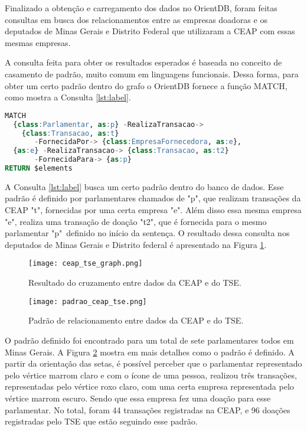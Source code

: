 Finalizado a obtenção e carregamento dos dados no OrientDB, foram feitas consultas em busca dos relacionamentos entre as empresas doadoras e os deputados de Minas Gerais e Distrito Federal que utilizaram a CEAP com essas mesmas empresas.
	
	A consulta feita para obter os resultados esperados é baseada no conceito de casamento de padrão, muito comum em linguagens funcionais. Dessa forma, para obter um certo padrão dentro do grafo o OrientDB fornece a função MATCH, como mostra a Consulta \ref{lst:label}.

\begin{lstlisting}[label={lst:label}, caption={Consulta de relacionamento de doações entre deputados e empresas.},captionpos=b, language=sql]
MATCH 
  {class:Parlamentar, as:p} -RealizaTransacao-> 
  	{class:Transacao, as:t} 
       -FornecidaPor-> {class:EmpresaFornecedora, as:e},
  {as:e} -RealizaTransacao-> {class:Transacao, as:t2} 
  	   -FornecidaPara-> {as:p}
RETURN $elements
\end{lstlisting}

A Consulta \ref{lst:label} busca um certo padrão dentro do banco de dados. Esse padrão é definido por parlamentares chamados de "p", que realizam transações da CEAP "t", fornecidas por uma certa empresa "e". Além disso essa mesma empresa "e", realiza uma transação de doação "t2", que é fornecida para o mesmo parlamentar "p"\ definido no início da sentença. O resultado dessa consulta nos deputados de Minas Gerais e Distrito federal é apresentado na Figura \ref{fig:ceap_tse_graph}.

\begin{figure}[H]
\centering
\texttt{[image: ceap\_tse\_graph.png]}
\caption{Resultado do cruzamento entre dados da CEAP e do TSE.}
\label{fig:ceap_tse_graph}
\end{figure}

\begin{figure}[H]
\centering
\texttt{[image: padrao\_ceap\_tse.png]}
\caption{Padrão de relacionamento entre dados da CEAP e do TSE.}
\label{fig:padrao_ceap_tse}
\end{figure}

O padrão definido foi encontrado para um total de sete parlamentares todos em Minas Gerais. A Figura \ref{fig:padrao_ceap_tse} mostra em mais detalhes como o padrão é definido. A partir da orientação das setas, é possível perceber que o parlamentar representado pelo vértice marrom claro e com o ícone de uma pessoa, realizou três transações, representadas pelo vértice roxo claro, com uma certa empresa representada pelo vértice marrom escuro. Sendo que essa empresa fez uma doação para esse parlamentar. No total, foram 44 transações registradas na CEAP, e 96 doações registradas pelo TSE que estão seguindo esse padrão.

